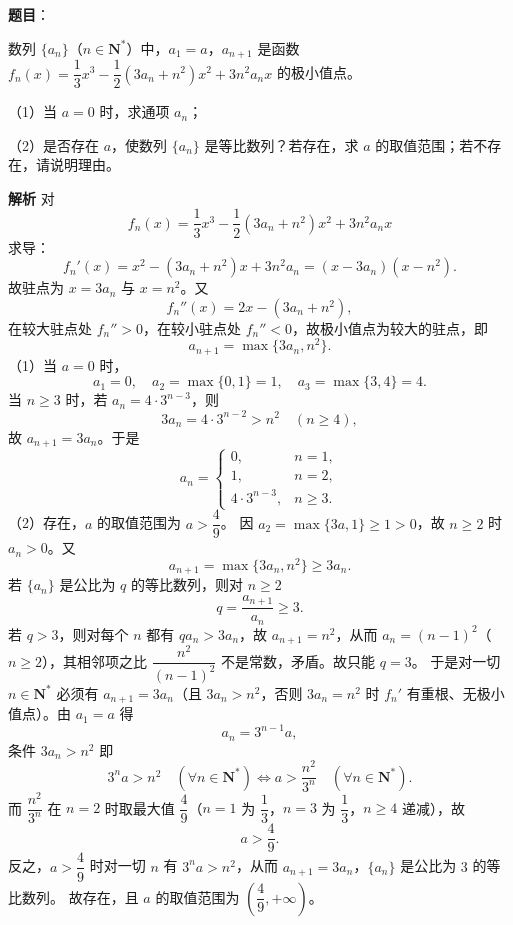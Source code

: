 \begin{answer}

\textbf{题目}：

数列 $\{a_n\}$（$n\in\mathbf N^*$）中，$a_1=a$，$a_{n+1}$ 是函数 $f_n(x)=\dfrac13x^3-\dfrac12(3a_n+n^2)x^2+3n^2a_nx$ 的极小值点。

（1）当 $a=0$ 时，求通项 $a_n$；

（2）是否存在 $a$，使数列 $\{a_n\}$ 是等比数列？若存在，求 $a$ 的取值范围；若不存在，请说明理由。

\textbf{解析}
对
\nopagebreak[4]
\[f_n(x)=\frac13x^3-\frac12(3a_n+n^2)x^2+3n^2a_nx\]
求导：
\nopagebreak[4]
\[f_n'(x)=x^2-(3a_n+n^2)x+3n^2a_n=(x-3a_n)(x-n^2).\]
故驻点为 $x=3a_n$ 与 $x=n^2$。又
\nopagebreak[4]
\[f_n''(x)=2x-(3a_n+n^2),\]
在较大驻点处 $f_n''>0$，在较小驻点处 $f_n''<0$，故极小值点为较大的驻点，即
\nopagebreak[4]
\[a_{n+1}=\max\{3a_n,n^2\}.\]
（1）当 $a=0$ 时，
\nopagebreak[4]
\[a_1=0,\quad a_2=\max\{0,1\}=1,\quad a_3=\max\{3,4\}=4.\]
当 $n\geqslant3$ 时，若 $a_n=4\cdot3^{n-3}$，则
\nopagebreak[4]
\[3a_n=4\cdot3^{n-2}>n^2\quad(n\geqslant4),\]
故 $a_{n+1}=3a_n$。于是
\nopagebreak[4]
\[a_n=\begin{cases}0,&n=1,\\[2pt]1,&n=2,\\[2pt]4\cdot3^{n-3},&n\geqslant3.\end{cases}\]
（2）存在，$a$ 的取值范围为 $a>\dfrac49$。
因 $a_2=\max\{3a,1\}\geqslant1>0$，故 $n\geqslant2$ 时 $a_n>0$。又
\nopagebreak[4]
\[a_{n+1}=\max\{3a_n,n^2\}\geqslant3a_n.\]
若 $\{a_n\}$ 是公比为 $q$ 的等比数列，则对 $n\geqslant2$
\nopagebreak[4]
\[q=\frac{a_{n+1}}{a_n}\geqslant3.\]
若 $q>3$，则对每个 $n$ 都有 $q a_n>3a_n$，故 $a_{n+1}=n^2$，从而 $a_n=(n-1)^2$（$n\geqslant2$），其相邻项之比 $\dfrac{n^2}{(n-1)^2}$ 不是常数，矛盾。故只能 $q=3$。
于是对一切 $n\in\mathbf N^*$ 必须有 $a_{n+1}=3a_n$（且 $3a_n>n^2$，否则 $3a_n=n^2$ 时 $f_n'$ 有重根、无极小值点）。由 $a_1=a$ 得
\nopagebreak[4]
\[a_n=3^{n-1}a,\]
条件 $3a_n>n^2$ 即
\nopagebreak[4]
\[3^n a>n^2\quad(\forall n\in\mathbf N^*)\iff a>\frac{n^2}{3^n}\quad(\forall n\in\mathbf N^*).\]
而 $\dfrac{n^2}{3^n}$ 在 $n=2$ 时取最大值 $\dfrac49$（$n=1$ 为 $\dfrac13$，$n=3$ 为 $\dfrac13$，$n\geqslant4$ 递减），故
\nopagebreak[4]
\[a>\frac49.\]
反之，$a>\dfrac49$ 时对一切 $n$ 有 $3^n a>n^2$，从而 $a_{n+1}=3a_n$，$\{a_n\}$ 是公比为 $3$ 的等比数列。
故存在，且 $a$ 的取值范围为 $\left(\dfrac49,+\infty\right)$。


\end{answer}